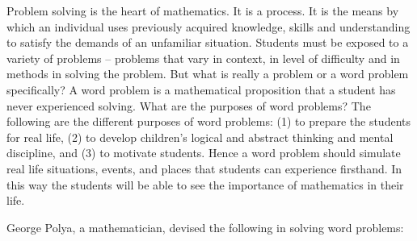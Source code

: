 Problem solving is the heart of mathematics. It is a process. It is the means by which an
individual uses previously acquired knowledge, skills and understanding to satisfy the demands of an
unfamiliar situation. Students must be exposed to a variety of problems – problems that vary in context,
in level of difficulty and in methods in solving the problem. But what is really a problem or a word
problem specifically? A word problem is a mathematical proposition that a student has never
experienced solving. What are the purposes of word problems? The following are the different
purposes of word problems: (1) to prepare the students for real life, (2) to develop children’s logical and
abstract thinking and mental discipline, and (3) to motivate students. Hence a word problem should
simulate real life situations, events, and places that students can experience firsthand. In this way the
students will be able to see the importance of mathematics in their life.

George Polya, a mathematician, devised the following  in solving word problems:

